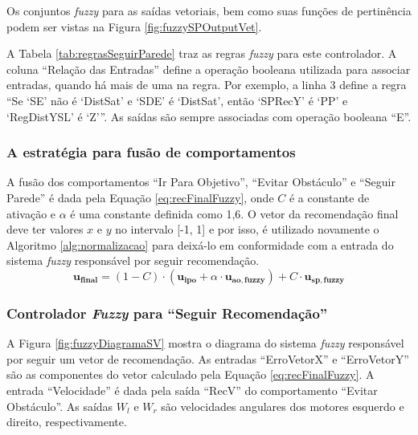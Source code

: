 	Os conjuntos \textit{fuzzy} para as saídas vetoriais, bem como suas funções de pertinência podem ser
	vistas na Figura \ref{fig:fuzzySPOutputVet}.

	
	
	A Tabela \ref{tab:regrasSeguirParede} traz as regras \textit{fuzzy} para este controlador.
	A coluna ``Relação das Entradas'' define a operação booleana utilizada para associar 
	entradas, quando há mais de uma na regra. Por exemplo, a linha 3 define a regra ``Se 
	`SE' não é `DistSat' e `SDE' é `DistSat', então `SPRecY' é `PP' e `RegDistYSL' é `Z'''.
	As saídas são sempre associadas com operação booleana ``E''.
	
	
	
	\subsubsection{A estratégia para fusão de comportamentos}
	
	A fusão dos comportamentos ``Ir Para Objetivo'', ``Evitar Obstáculo'' e ``Seguir Parede''
	é dada pela Equação \ref{eq:recFinalFuzzy}, onde $C$ é a constante de ativação e $\alpha$ 
	é uma constante definida como 1,6. O vetor da recomendação final deve ter valores $x$ e $y$ no 
	intervalo [-1, 1] e por isso, é utilizado novamente o Algoritmo \ref{alg:normalizacao} 
	para deixá-lo em conformidade com a entrada do sistema \textit{fuzzy} responsável por 
	seguir recomendação.
	\begin{equation}
		\label{eq:recFinalFuzzy}
			\mathbf{u_{final}} = 
			(1 - C) \cdot (\mathbf{u_{ipo}} + \alpha \cdot \mathbf{u_{ao, fuzzy}})
			+ C \cdot \mathbf{u_{sp, fuzzy}}
	\end{equation}
	
	\subsubsection{Controlador \textit{Fuzzy} para ``Seguir Recomendação''}
	
	A Figura \ref{fig:fuzzyDiagramaSV} mostra o diagrama do sistema \textit{fuzzy} responsável 
	por seguir um vetor de recomendação. As entradas ``ErroVetorX'' e ``ErroVetorY'' são as 
	componentes do vetor calculado pela Equação \ref{eq:recFinalFuzzy}. A entrada 
	``Velocidade'' é dada pela saída ``RecV'' do comportamento ``Evitar Obstáculo''. As
	saídas $W_l$ e $W_r$ são velocidades angulares dos motores esquerdo e direito, 
	respectivamente.
	
